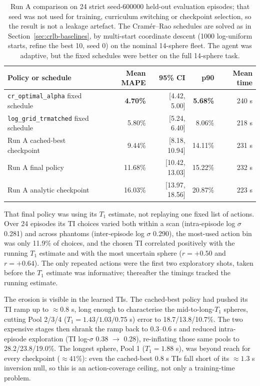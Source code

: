 \begin{table}[!htbp]
\centering
\scriptsize
\setlength{\tabcolsep}{3pt}
\renewcommand{\arraystretch}{0.92}
\begin{tabular}{lrrrr}
\toprule
Policy or schedule & Mean MAPE & 95\% CI & p90 & Mean time \\
\midrule
\texttt{cr\_optimal\_alpha} fixed schedule & \textbf{4.70\%} & [4.42, 5.00] & \textbf{5.68\%} & 240 s \\
\texttt{log\_grid\_trmatched} fixed schedule & 5.80\% & [5.24, 6.40] & 8.06\% & 218 s \\
Run A cached-best checkpoint & 9.44\% & [8.18, 10.94] & 14.11\% & 231 s \\
Run A final policy & 11.68\% & [10.42, 13.03] & 15.22\% & 232 s \\
Run A analytic checkpoint & 16.03\% & [13.97, 18.56] & 20.87\% & 223 s \\
\bottomrule
\end{tabular}
\caption{Run A comparison on 24 strict seed-600000 held-out evaluation episodes;
that seed was not used for training, curriculum switching or checkpoint
selection, so the result is not a leakage artefact. The Cram\'er--Rao schedules
are solved as in Section~\ref{sec:crlb-baselines}, by multi-start coordinate
descent (1000 log-uniform starts, refine the best 10, seed 0) on the nominal
14-sphere fleet. The agent was adaptive, but the fixed schedules were better on
the full 14-sphere task.}
\label{tab:run-a-current-comparison}
\end{table}

That final policy was using its $T_1$ estimate, not replaying one fixed list of
actions. Over 24 episodes its TI choices varied both within a scan
(intra-episode log $\sigma$ 0.281) and across phantoms (inter-episode log
$\sigma$ 0.290), the most-used action bin was only 11.9\% of choices, and the
chosen TI correlated positively with the running $T_1$ estimate and with the
most uncertain sphere ($r=+0.50$ and $r=+0.64$). The only repeated actions were
the first two exploratory shots, taken before the $T_1$ estimate was informative;
thereafter the timings tracked the running estimate.

The erosion is visible in the learned TIs. The cached-best policy
had pushed its TI ramp up to ${\approx}0.8$ s, long enough to characterise the
mid-to-long-$T_1$ spheres, cutting Pool 2/3/4 ($T_1 = 1.43/1.03/0.75$ s) error
to 18.7/13.8/10.7\%. The two expensive stages then shrank the ramp back to
0.3--0.6 s and reduced intra-episode exploration (TI log-$\sigma$ 0.38 $\to$
0.28), re-inflating those same pools to 28.2/23.8/19.0\%. The longest sphere,
Pool 1 ($T_1=1.88$ s), was beyond reach for every checkpoint (${\approx}41\%$):
even the cached-best 0.8 s TIs fall short of its ${\approx}1.3$ s inversion
null, so this is an action-coverage ceiling, not only a training-time problem.

